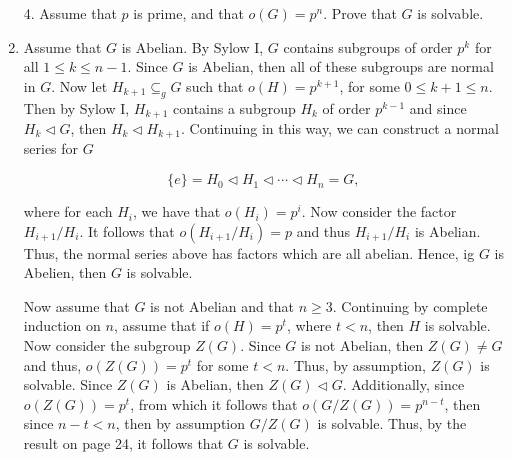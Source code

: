 \documentclass[12pt]{article}
\makeatletter
\theoremstyle{definition}
\theoremstyle{remark}
\renewenvironment{proof}[1][\proofname]{\par
  \pushQED{\qed}%
  \normalfont \topsep6\p@\@plus6\p@\relax
  \list{}{\leftmargin=0mm
          \rightmargin=4mm
          \settowidth{\itemindent}{\itshape#1}%
          \labelwidth=\itemindent
          \parsep=0pt \listparindent=\parindent 
  }
  \item[\hskip\labelsep
        \itshape
    #1\@addpunct{.}]\ignorespaces
}{%
  \popQED\endlist\@endpefalse
}
\let\oldproofname=\proofname
\renewcommand{\proofname}{\bf{\textit{\oldproofname}}}
\makeatother
\begin{document}
\begin{enumerate}[leftmargin=*]
        \newpage
            
        \item[4.] Assume that $p$ is prime, and that $o(G)=p^n$. Prove that $G$ is solvable.
            \begin{proof}
                Assume that $G$ is Abelian. By Sylow I, $G$ contains subgroups of order $p^k$ for all $1\leq k\leq n-1$. Since $G$ is Abelian, then all of these subgroups are normal in $G$. Now let $H_{k+1}\subseteq_g G$ such that $o(H)=p^{k+1}$, for some $0\leq k+1\leq n$. Then by Sylow I, $H_{k+1}$ contains a subgroup $H_k$ of order $p^{k-1}$ and since $H_k \triangleleft G$, then $H_k\triangleleft H_{k+1}$. Continuing in this way, we can construct a normal series for $G$
                
                \begin{equation*}
                    \{e\}=H_0\triangleleft H_1\triangleleft\cdots\triangleleft H_n=G,
                \end{equation*}
                
                where for each $H_i$, we have that $o(H_i)=p^i$. Now consider the factor $H_{i+1}/H_i$. It follows that $o(H_{i+1}/H_i)=p$ and thus $H_{i+1}/H_i$ is Abelian. Thus, the normal series above has factors which are all abelian. Hence, ig $G$ is Abelien, then $G$ is solvable.\par\hspace{4mm} Now assume that $G$ is not Abelian and that $n\geq 3$. Continuing by complete induction on $n$, assume that if $o(H)=p^t$, where $t<n$, then $H$ is solvable. Now consider the subgroup $Z(G)$. Since $G$ is not Abelian, then $Z(G)\neq G$ and thus, $o(Z(G))=p^t$ for some $t<n$. Thus, by assumption, $Z(G)$ is solvable. Since $Z(G)$ is Abelian, then $Z(G)\triangleleft G$. Additionally, since $o(Z(G))=p^t$, from which it follows that $o(G/Z(G))=p^{n-t}$, then since $n-t<n$, then by assumption $G/Z(G)$ is solvable. Thus, by the result on page 24, it follows that $G$ is solvable.
            \end{proof}
            

\end{enumerate}
\end{document}
